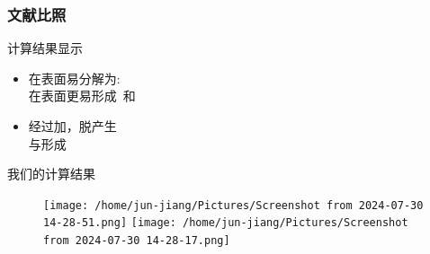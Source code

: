 \begin{frame}
	\frametitle{文献比照}
	计算结果显示
	\begin{itemize}
		\item \textrm{}在\textrm{}表面易分解为\textrm{}:\\
			\textrm{}在\textrm{}表面更易形成~\textcolor{red}{\textrm{}}和~\textcolor{red}{\textrm{}}
		\item \textrm{}经过加\textrm{}，脱\textrm{}产生\textrm{}\\
			\textrm{}与\textrm{}形成~\textcolor{red}{\textrm{}}
	\end{itemize}
	我们的计算结果
\begin{figure}[h!]
\centering
\texttt{[image: /home/jun-jiang/Pictures/Screenshot from 2024-07-30 14-28-51.png]}
\texttt{[image: /home/jun-jiang/Pictures/Screenshot from 2024-07-30 14-28-17.png]}
\label{CO2_0n_Ni-CO}
\end{figure}
\end{frame}

